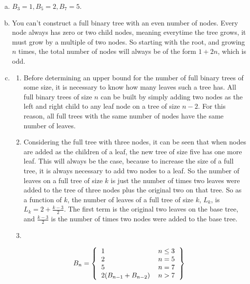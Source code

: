 \documentclass[a4paper,12pt]{article}
\begin{document}
\begin{enumerate}[a)]

\item $B_3 = 1, B_5 = 2, B_7 = 5$.

\item You can't construct a full binary tree with an even number of
  nodes. Every node always has zero or two child nodes, meaning
  everytime the tree grows, it must grow by a multiple of two
  nodes. So starting with the root, and growing $n$ times, the total
  number of nodes will always be of the form $1 + 2n$, which is odd.

\item

  \begin{enumerate}[]
    
  \item Before determining an upper bound for the number of full
    binary trees of some size, it is necessary to know how many leaves
    such a tree has. All full binary trees of size $n$ can be built by
    simply adding two nodes as the left and right child to any leaf
    node on a tree of size $n-2$. For this reason, all full trees with
    the same number of nodes have the same number of leaves.

  \item Considering the full tree with three nodes, it can be seen
    that when nodes are added as the children of a leaf, the new tree
    of size five has one more leaf. This will always be the case,
    because to increase the size of a full tree, it is always
    necessary to add two nodes to a leaf. So the number of leaves on a
    full tree of size $k$ is just the number of times two leaves were
    added to the tree of three nodes plus the original two on that
    tree. So as a function of $k$, the number of leaves of a full tree
    of size $k$, $L_k$, is $L_k = 2 + \frac{k-3}{2}$. The first term is the original
    two leaves on the base tree, and $\frac{k-3}{2}$ is the number of
    times two nodes were added to the base tree.


  \item 
    

  \end{enumerate}

  \[B_n = \left\{
    \begin{tabular}{l r}
      1 & $n \le 3$\\
      2 & $n=5$\\
      5 & $n=7$\\
      $2(B_{n-1} + B_{n-2})$ &  $n > 7$\\
    \end{tabular}
  \right\}\]

\end{enumerate}
\end{document}
